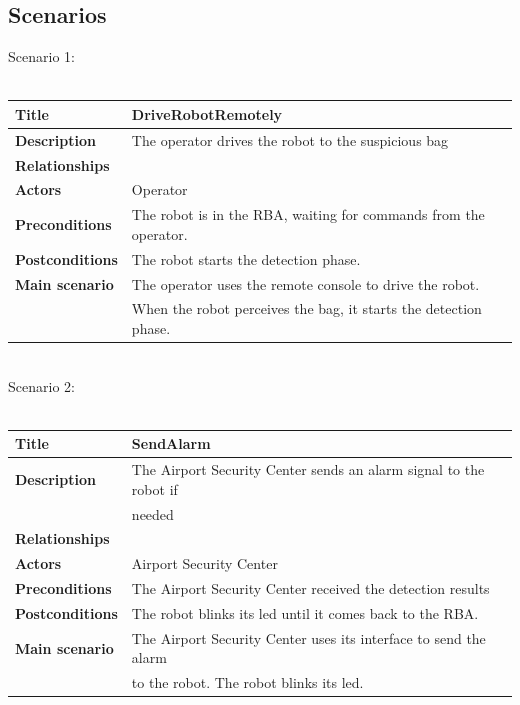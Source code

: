 \documentclass{llncs}
\newcommand{\labelssec}[1]{\label{ssec:#1}}
\begin{document}
\subsection{Scenarios}
\labelssec{Scenarios}
Scenario 1:\\ \\
\begin{tabular}{| l | l |}
	\hline
	\textbf{Title} & DriveRobotRemotely
	\\ \hline
	\textbf{Description}  & The operator drives the robot to the suspicious bag
	\\ \hline
	\textbf{Relationships} & 
	\\ \hline
	\textbf{Actors} & Operator
	\\ \hline
	\textbf{Preconditions} & The robot is in the RBA, waiting for commands from the operator.
	\\ \hline
	\textbf{Postconditions} & The robot starts the detection phase.
	\\ \hline
	\textbf{Main scenario} & The operator uses the remote console to drive the robot. \\ &
	When the robot perceives the bag, it starts the detection phase.
	\\ \hline
\end{tabular}
\\ Scenario 2:\\ \\
\begin{tabular}{| l | l |}
	\hline
	\textbf{Title} & SendAlarm
	\\ \hline
	\textbf{Description}  & The Airport Security Center sends an alarm signal to the robot if \\ & needed
	\\ \hline
	\textbf{Relationships} & 
	\\ \hline
	\textbf{Actors} & Airport Security Center
	\\ \hline
	\textbf{Preconditions} & The Airport Security Center received the detection results
	\\ \hline
	\textbf{Postconditions} & The robot blinks its led until it comes back to the RBA.
	\\ \hline
	\textbf{Main scenario} & 
	The Airport Security Center uses its interface to send the alarm \\ & to the robot.
	The robot blinks its led.
	\\ \hline
\end{tabular}

\end{document}
